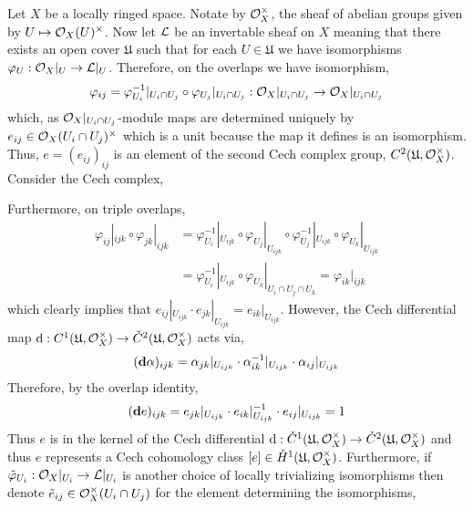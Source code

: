 \documentclass[12pt]{article}
\begin{document}
Let $X$ be a locally ringed space. Notate by $\mathcal{O}_{X}^\times$, the sheaf of abelian groups given by $U \mapsto \mathcal{O}_{X}(U)^\times$. Now let $\mathcal{L}$ be an invertable sheaf on $X$ meaning that there exists an open cover $\mathfrak{U}$ such that for each $U \in \mathfrak{U}$ we have isomorphisms $\varphi_U : \mathcal{O}_{X}|_U \to \mathcal{L}|_U$. Therefore, on the overlaps we have isomorphism,
\[ \varphi_{ij} = \varphi_{U_i}^{-1}|_{U_i \cap U_j} \circ \varphi_{U_j} |_{U_i \cap U_j} : \mathcal{O}_{X} |_{U_i \cap U_j} \to \mathcal{O}_{X} |_{U_i \cap U_j} \]
which, as $\mathcal{O}_{X}|_{U_i \cap U_j}$-module maps are determined uniquely by $e_{ij} \in \mathcal{O}_{X}(U_i \cap U_j)^\times$ which is a unit because the map it defines is an isomorphism. Thus, $e = (e_{ij})_{ij}$ is an element of the second Cech complex group, $C^2(\mathfrak{U}, \mathcal{O}_{X}^\times)$. Consider the Cech complex,
\begin{center}
\end{center}
Furthermore, on triple overlaps,
\begin{align*}
\varphi_{ij}|_{ijk} \circ \varphi_{jk}|_{ijk} & = \varphi_{U_i}^{-1}|_{U_{ijk}} \circ \varphi_{U_j} |_{U_{ijk}} \circ \varphi_{U_j}^{-1}|_{U_{ijk}} \circ \varphi_{U_k} |_{U_{ijk}} 
\\
& = \varphi_{U_i}^{-1}|_{U_{ijk}} \circ \varphi_{U_k} |_{U_i \cap U_j \cap U_k} = \varphi_{ik} |_{ijk} 
\end{align*}
which clearly implies that $e_{ij} |_{U_{ijk}} \cdot e_{jk} |_{U_{ijk}} = e_{ik} |_{U_{ijk}}$. However, the Cech differential map $\mathrm{d} : C^1(\mathfrak{U}, \mathcal{O}_{X}^\times) \to \check{C}^2(\mathfrak{U}, \mathcal{O}_{X}^\times)$ acts via,
\[ (\mathbf{d}{\alpha})_{ijk} = \alpha_{jk} |_{U_{ijk}} \cdot \alpha_{ik}^{-1} |_{U_{ijk}} \cdot \alpha_{ij} |_{U_{ijk}} \]
Therefore, by the overlap identity,
\[ (\mathbf{d}{e})_{ijk} = e_{jk}|_{U_{ijk}} \cdot e_{ik}|_{U_{ijk}}^{-1} \cdot e_{ij} |_{U_{ijk}} = 1 \]
Thus $e$ is in the kernel of the Cech differential $\mathrm{d} : \check{C}^1(\mathfrak{U}, \mathcal{O}_{X}^\times) \to \check{C}^2(\mathfrak{U}, \mathcal{O}_{X}^\times)$ and thus $e$ represents a Cech cohomology class $[e] \in \check{H}^1(\mathfrak{U}, \mathcal{O}_{X}^\times)$. Furthermore, if $\tilde{\varphi}_{U_i} : \mathcal{O}_{X} |_{U_i} \to \mathcal{L} |_{U_i}$ is another choice of locally trivializing isomorphisms then denote $\tilde{e}_{ij} \in \mathcal{O}_{X}^\times(U_i \cap U_j)$ for the element determining the isomorphisms,
\end{document}
